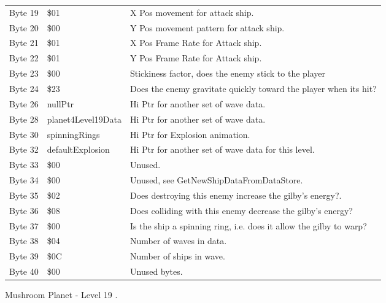 \begin{figure}[H]
{\begin{adjustbox}{width=12cm}
\begin{tabular}{lll}
 Byte 19 & \$01                      & X Pos movement for attack ship.                                    \\
 Byte 20 & \$00                      & Y Pos movement pattern for attack ship.                            \\
 Byte 21 & \$01                      & X Pos Frame Rate for Attack ship.                                  \\
 Byte 22 & \$01                      & Y Pos Frame Rate for Attack ship.                                  \\
 Byte 23 & \$00                      & Stickiness factor, does the enemy stick to the player              \\
 Byte 24 & \$23                      & Does the enemy gravitate quickly toward the player when its hit?   \\
 Byte 26 & nullPtr                  & Hi Ptr for another set of wave data.                               \\
 Byte 28 & planet4Level19Data       & Hi Ptr for another set of wave data.                               \\
 Byte 30 & spinningRings            & Hi Ptr for Explosion animation.                                    \\
 Byte 32 & defaultExplosion         & Hi Ptr for another set of wave data for this level.                \\
 Byte 33 & \$00                      & Unused.                                                            \\
 Byte 34 & \$00                      & Unused, see GetNewShipDataFromDataStore.                           \\
 Byte 35 & \$02                      & Does destroying this enemy increase the gilby's energy?.           \\
 Byte 36 & \$08                      & Does colliding with this enemy decrease the gilby's energy?        \\
 Byte 37 & \$00                      & Is the ship a spinning ring, i.e. does it allow the gilby to warp? \\
 Byte 38 & \$04                      & Number of waves in data.                                           \\
 Byte 39 & \$0C                      & Number of ships in wave.                                           \\
 Byte 40 & \$00                      & Unused bytes.                                                      \\
\bottomrule
\end{tabular}

  \end{adjustbox}

  }\caption*{Mushroom Planet - Level 19
.}
\end{figure}


